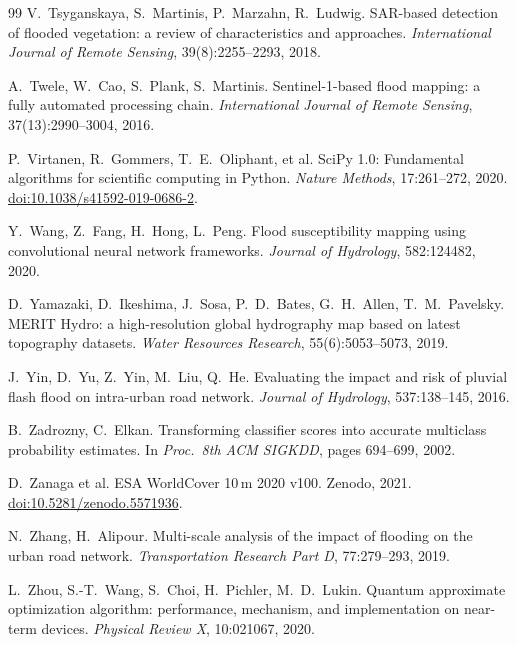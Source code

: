 \documentclass[11pt,a4paper]{article}
\begin{document}
\begin{thebibliography}{99}
V.~Tsyganskaya, S.~Martinis, P.~Marzahn, R.~Ludwig.
SAR-based detection of flooded vegetation: a review of characteristics and
approaches.
\emph{International Journal of Remote Sensing}, 39(8):2255--2293, 2018.

A.~Twele, W.~Cao, S.~Plank, S.~Martinis.
Sentinel-1-based flood mapping: a fully automated processing chain.
\emph{International Journal of Remote Sensing}, 37(13):2990--3004, 2016.

P.~Virtanen, R.~Gommers, T.~E.~Oliphant, et al.
SciPy 1.0: Fundamental algorithms for scientific computing in Python.
\emph{Nature Methods}, 17:261--272, 2020.
\href{https://doi.org/10.1038/s41592-019-0686-2}{doi:10.1038/s41592-019-0686-2}.

Y.~Wang, Z.~Fang, H.~Hong, L.~Peng.
Flood susceptibility mapping using convolutional neural network frameworks.
\emph{Journal of Hydrology}, 582:124482, 2020.

D.~Yamazaki, D.~Ikeshima, J.~Sosa, P.~D.~Bates, G.~H.~Allen, T.~M.~Pavelsky.
MERIT Hydro: a high-resolution global hydrography map based on latest topography
datasets.
\emph{Water Resources Research}, 55(6):5053--5073, 2019.

J.~Yin, D.~Yu, Z.~Yin, M.~Liu, Q.~He.
Evaluating the impact and risk of pluvial flash flood on intra-urban road network.
\emph{Journal of Hydrology}, 537:138--145, 2016.

B.~Zadrozny, C.~Elkan.
Transforming classifier scores into accurate multiclass probability estimates.
In \emph{Proc.\ 8th ACM SIGKDD}, pages 694--699, 2002.

D.~Zanaga et al. ESA WorldCover 10\,m 2020 v100. Zenodo, 2021.
\href{https://doi.org/10.5281/zenodo.5571936}{doi:10.5281/zenodo.5571936}.

N.~Zhang, H.~Alipour.
Multi-scale analysis of the impact of flooding on the urban road network.
\emph{Transportation Research Part D}, 77:279--293, 2019.

L.~Zhou, S.-T.~Wang, S.~Choi, H.~Pichler, M.~D.~Lukin.
Quantum approximate optimization algorithm: performance, mechanism, and
implementation on near-term devices.
\emph{Physical Review X}, 10:021067, 2020.



\end{thebibliography}
\end{document}
